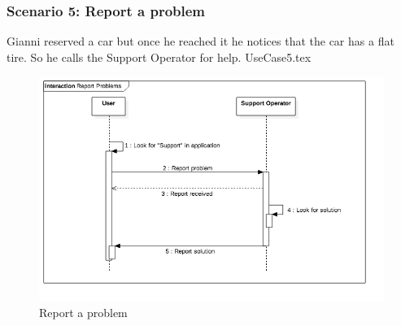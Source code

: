 \documentclass[12pt]{article}
\begin{document}
		\subsubsection{Scenario 5: Report a problem}
		Gianni reserved a car but once he reached it he notices that the car has a flat
		tire. So he calls the Support Operator for help.
		\FloatBarrier
		{UseCase5.tex}
		\begin{figure}[htbp]
		 \caption{Report a problem}
		\includegraphics[scale=0.49]{Images/SequenceDiagram/Report.png}
 	 	\end{figure}
 	 	\clearpage
		
\end{document}
